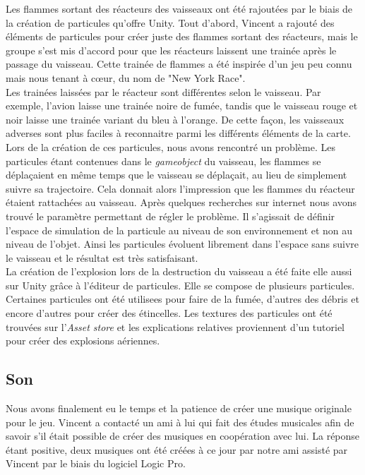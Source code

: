 \documentclass[12pt, titlepage]{article}
\begin{document}
\begin{spacing}{1.5}
Les flammes sortant des réacteurs des vaisseaux ont été rajoutées par le biais de la création de particules qu'offre Unity. Tout d'abord, Vincent a rajouté des éléments de particules pour créer juste des flammes sortant des réacteurs, mais le groupe s'est mis d'accord pour que les réacteurs laissent une trainée après le passage du vaisseau. Cette trainée de flammes a été inspirée d’un jeu peu connu mais nous tenant à cœur, du nom de "New York Race". \\

Les trainées laissées par le réacteur sont différentes selon le vaisseau. Par exemple, l'avion laisse une trainée noire de fumée, tandis que le vaisseau rouge et noir laisse une trainée variant du bleu à l’orange. De cette façon, les vaisseaux adverses sont plus faciles à reconnaitre parmi les différents éléments de la carte. \\

Lors de la création de ces particules, nous avons rencontré un problème. Les particules étant contenues dans le \textit{gameobject} du vaisseau, les flammes se déplaçaient en même temps que le vaisseau se déplaçait, au lieu de simplement suivre sa trajectoire. Cela donnait alors l’impression que les flammes du réacteur étaient rattachées au vaisseau. Après quelques recherches sur internet nous avons trouvé le paramètre permettant de régler le problème. Il s'agissait de définir l'espace de simulation de la particule au niveau de son environnement et non au niveau de l'objet. Ainsi les particules évoluent librement dans l’espace sans suivre le vaisseau et le résultat est très satisfaisant.\\

La création de l’explosion lors de la destruction du vaisseau a été faite elle aussi sur Unity grâce à l’éditeur de particules. Elle se compose de plusieurs particules. Certaines particules ont été utilisees pour faire de la fumée, d'autres des débris et encore d'autres pour créer des étincelles. Les textures des particules ont été trouvées sur l’\textit{Asset store} et les explications relatives proviennent d'un tutoriel pour créer des explosions aériennes.\\

\newpage
\subsection{Son}

Nous avons finalement eu le temps et la patience de créer une musique originale pour le jeu. Vincent a contacté un ami à lui qui fait des études musicales afin de savoir s'il était possible de créer des musiques en coopération avec lui. La réponse étant positive, deux musiques ont été créées à ce jour par notre ami assisté par Vincent par le biais du logiciel Logic Pro. \\


\end{spacing}
\end{document}

